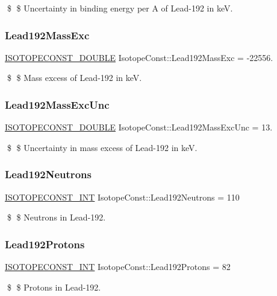 \$ \$ Uncertainty in binding energy per A of Lead-\/192 in keV. \mbox{\label{group___isotope_const-_lead-_pb192_ga9097daba7e1b3b34dbd6ac27f7079841}} 
\subsubsection{\texorpdfstring{Lead192\+Mass\+Exc}{Lead192MassExc}}
{\footnotesize\ttfamily \mbox{\hyperlink{group___isotope_const-_macros_ga8f45a7272ce02c0b4c65c44636ed719a}{I\+S\+O\+T\+O\+P\+E\+C\+O\+N\+S\+T\+\_\+\+D\+O\+U\+B\+LE}} Isotope\+Const\+::\+Lead192\+Mass\+Exc = -\/22556.}

\$ \$ Mass excess of Lead-\/192 in keV. \mbox{\label{group___isotope_const-_lead-_pb192_gabf0a96fc653b5a72bff4b08cf56ed2dd}} 
\subsubsection{\texorpdfstring{Lead192\+Mass\+Exc\+Unc}{Lead192MassExcUnc}}
{\footnotesize\ttfamily \mbox{\hyperlink{group___isotope_const-_macros_ga8f45a7272ce02c0b4c65c44636ed719a}{I\+S\+O\+T\+O\+P\+E\+C\+O\+N\+S\+T\+\_\+\+D\+O\+U\+B\+LE}} Isotope\+Const\+::\+Lead192\+Mass\+Exc\+Unc = 13.}

\$ \$ Uncertainty in mass excess of Lead-\/192 in keV. \mbox{\label{group___isotope_const-_lead-_pb192_ga2aed9715774b9c358d2069a0bcfab72e}} 
\subsubsection{\texorpdfstring{Lead192\+Neutrons}{Lead192Neutrons}}
{\footnotesize\ttfamily \mbox{\hyperlink{group___isotope_const-_macros_ga5f18360b3e99483a35c32d789e62621c}{I\+S\+O\+T\+O\+P\+E\+C\+O\+N\+S\+T\+\_\+\+I\+NT}} Isotope\+Const\+::\+Lead192\+Neutrons = 110}

\$ \$ Neutrons in Lead-\/192. \mbox{\label{group___isotope_const-_lead-_pb192_gab202f9f704b254255b4dac7b64f4ebaf}} 
\subsubsection{\texorpdfstring{Lead192\+Protons}{Lead192Protons}}
{\footnotesize\ttfamily \mbox{\hyperlink{group___isotope_const-_macros_ga5f18360b3e99483a35c32d789e62621c}{I\+S\+O\+T\+O\+P\+E\+C\+O\+N\+S\+T\+\_\+\+I\+NT}} Isotope\+Const\+::\+Lead192\+Protons = 82}

\$ \$ Protons in Lead-\/192. 